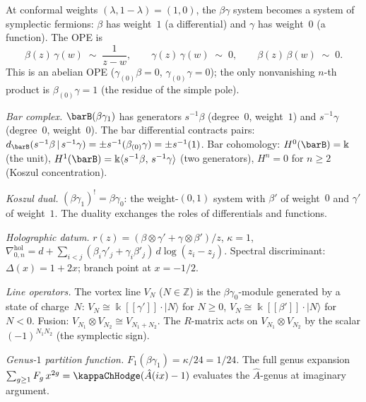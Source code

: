 \begin{computation}[$\beta\gamma$ at $\lambda=1$: symplectic
fermions as a holographic system; \ClaimStatusProvedHere]
At conformal weights $(\lambda,1{-}\lambda)=(1,0)$, the
$\beta\gamma$ system becomes a system of symplectic fermions:
$\beta$ has weight~$1$ (a differential) and $\gamma$ has
weight~$0$ (a function). The OPE is
\[
\beta(z)\,\gamma(w)\;\sim\;\frac{1}{z-w},
\qquad
\gamma(z)\,\gamma(w)\;\sim\;0,
\qquad
\beta(z)\,\beta(w)\;\sim\;0.
\]
This is an abelian OPE ($\gamma_{(0)}\beta=0$,
$\gamma_{(0)}\gamma=0$); the only nonvanishing $n$-th product
is $\beta_{(0)}\gamma=1$ (the residue of the simple pole).

\emph{Bar complex.}
$\barB(\beta\gamma_1)$ has generators $s^{-1}\beta$ (degree~$0$,
weight~$1$) and $s^{-1}\gamma$ (degree~$0$, weight~$0$).
The bar differential contracts pairs:
$d_{\barB}(s^{-1}\beta\,|\,s^{-1}\gamma)
=\pm s^{-1}(\beta_{(0)}\gamma)=\pm s^{-1}(1)$.
Bar cohomology: $H^0(\barB)=\Bbbk$ (the unit),
$H^1(\barB)=\Bbbk\langle s^{-1}\beta,\,s^{-1}\gamma\rangle$
(two generators), $H^n=0$ for $n\ge 2$ (Koszul concentration).

\emph{Koszul dual.}
$(\beta\gamma_1)^!=\beta\gamma_0$: the weight-$(0,1)$ system
with $\beta'$ of weight~$0$ and $\gamma'$ of weight~$1$.
The duality exchanges the roles of differentials and functions.

\emph{Holographic datum.}
$r(z)=(\beta\otimes\gamma'+\gamma\otimes\beta')/z$,
$\kappa=1$,
$\nabla^{\mathrm{hol}}_{0,n}
=d+\sum_{i<j}
(\beta_i\gamma'_j+\gamma_i\beta'_j)\,d\log(z_i-z_j)$.
Spectral discriminant: $\Delta(x)=1+2x$; branch point at
$x=-1/2$.

\emph{Line operators.}
The vortex line $V_N$ ($N\in\mathbb Z$) is the
$\beta\gamma_0$-module generated by a state of charge~$N$:
$V_N\cong\Bbbk[[\gamma']]\cdot|N\rangle$ for $N\ge 0$,
$V_N\cong\Bbbk[[\beta']]\cdot|N\rangle$ for $N<0$.
Fusion: $V_{N_1}\otimes V_{N_2}\cong V_{N_1+N_2}$.
The $R$-matrix acts on $V_{N_1}\otimes V_{N_2}$ by the scalar
$(-1)^{N_1 N_2}$ (the symplectic sign).

\emph{Genus-$1$ partition function.}
$F_1(\beta\gamma_1)=\kappa/24 = 1/24$.
The full genus expansion
$\sum_{g\ge 1}F_g\,x^{2g}=\kappaChHodge(\hat A(ix)-1)$
evaluates the $\hat A$-genus at imaginary argument.
\end{computation}

